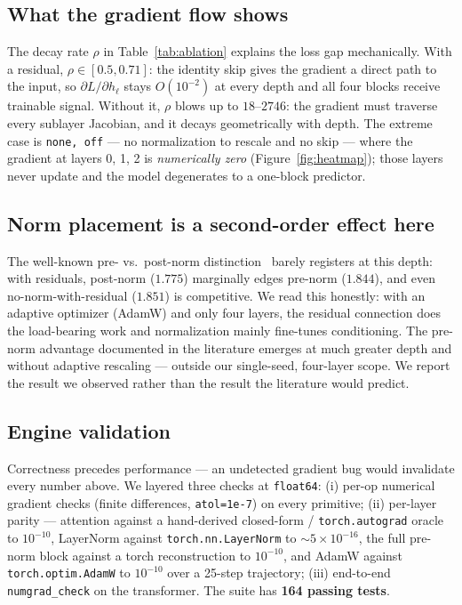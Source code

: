 \documentclass{article}
\begin{document}
\subsection{What the gradient flow shows} The decay rate $\rho$ in Table~\ref{tab:ablation} explains the loss gap mechanically. With a residual, $\rho\in[0.5,0.71]$: the identity skip gives the gradient a direct path to the input, so $\partial L/\partial h_\ell$ stays $O(10^{-2})$ at every depth and all four blocks receive trainable signal. Without it, $\rho$ blows up to $18$--$2746$: the gradient must traverse every sublayer Jacobian, and it decays geometrically with depth. The extreme case is \texttt{none, off} — no normalization to rescale and no skip — where the gradient at layers 0, 1, 2 is \emph{numerically zero} (Figure~\ref{fig:heatmap}); those layers never update and the model degenerates to a one-block predictor.

\subsection{Norm placement is a second-order effect here} The well-known pre- vs.\ post-norm distinction~\cite{xiong2020prenorm} barely registers at this depth: with residuals, post-norm ($1.775$) marginally edges pre-norm ($1.844$), and even no-norm-with-residual ($1.851$) is competitive. We read this honestly: with an adaptive optimizer (AdamW) and only four layers, the residual connection does the load-bearing work and normalization mainly fine-tunes conditioning. The pre-norm advantage documented in the literature emerges at much greater depth and without adaptive rescaling — outside our single-seed, four-layer scope. We report the result we observed rather than the result the literature would predict.

\subsection{Engine validation} Correctness precedes performance — an undetected gradient bug would invalidate every number above. We layered three checks at \texttt{float64}: (i) per-op numerical gradient checks (finite differences, \texttt{atol=1e-7}) on every primitive; (ii) per-layer parity — attention against a hand-derived closed-form / \texttt{torch.autograd} oracle to $10^{-10}$, LayerNorm against \texttt{torch.nn.LayerNorm} to $\sim\!5\times10^{-16}$, the full pre-norm block against a torch reconstruction to $10^{-10}$, and AdamW against \texttt{torch.optim.AdamW} to $10^{-10}$ over a 25-step trajectory; (iii) end-to-end \texttt{numgrad\_check} on the transformer. The suite has \textbf{164 passing tests}.
\end{document}
